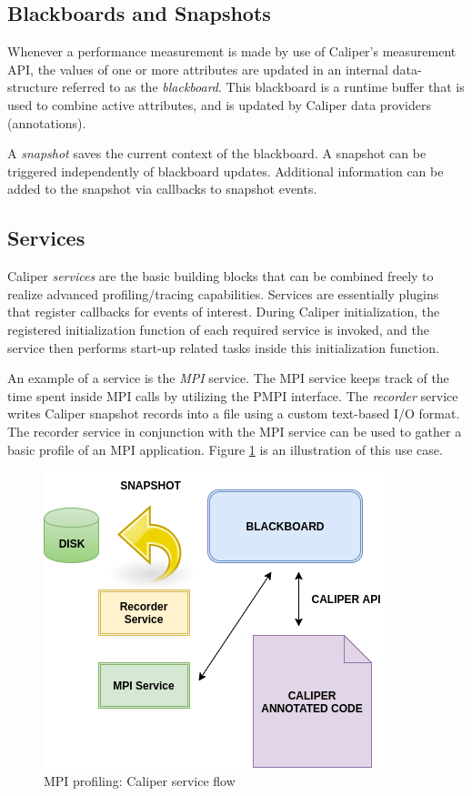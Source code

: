 \subsection{Blackboards and Snapshots}
Whenever a performance measurement is made by use of Caliper's measurement API, the values of one or more attributes are updated in an internal data-structure referred to as the \textit{blackboard}. This blackboard is a runtime buffer that is used to combine active attributes, and is updated by Caliper data providers (annotations).
\par A \textit{snapshot} saves the current context of the blackboard. A snapshot can be triggered independently of blackboard updates. Additional information can be added to the snapshot via callbacks to snapshot events. 
\subsection{Services}
Caliper \emph{services} are the basic building blocks that can be combined freely to realize advanced profiling/tracing capabilities. Services are essentially plugins that register callbacks for events of interest. During Caliper initialization, the registered initialization function of each required service is invoked, and the service then performs start-up related tasks inside this initialization function. 
\par An example of a service is the \textit{MPI} service. The MPI service keeps track of the time spent inside MPI calls by utilizing the PMPI interface. The \textit{recorder} service writes Caliper snapshot records into a file using a custom text-based I/O format. The recorder service in conjunction with the MPI service can be used to gather a basic profile of an MPI application. Figure \ref{fig:caliservices} is an illustration of this use case. 
\begin{center}
	\begin{figure}[bp!]
         \centering
  \captionsetup{justification=centering}
		\includegraphics[scale=0.7, keepaspectratio]{figures/cali-services}
		\caption{MPI profiling: Caliper service flow}
		\label{fig:caliservices}
	\end{figure}
\end{center}

